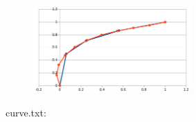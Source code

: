 \documentclass[12pt, a4paper]{article}
\begin{document}
\begin{center}
\begin{figure}[H]
\centering\includegraphics[width=6cm]{./cloud3.png}\\
\end{figure}
\end{center}

curve.txt:\\
\begin{scriptsize}
\begin{ttfamily}

\end{ttfamily}
\end{scriptsize}
\end{document}
